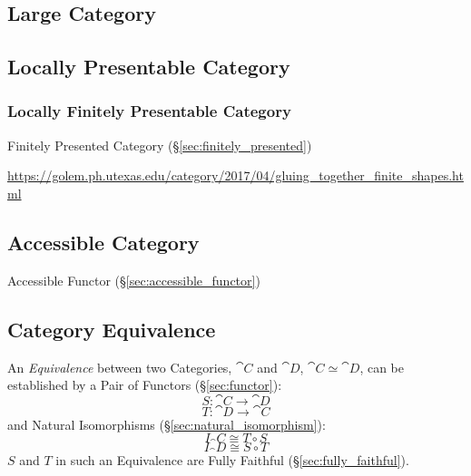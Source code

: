\subsection{Large Category}\label{sec:large_category}

\subsection{Locally Presentable Category}\label{sec:locally_presentable}



\subsubsection{Locally Finitely Presentable Category}
\label{sec:lfp_category}

\fist Finitely Presented Category (\S\ref{sec:finitely_presented})

\url{https://golem.ph.utexas.edu/category/2017/04/gluing_together_finite_shapes.html}



\subsection{Accessible Category}\label{sec:accessible_category}

Accessible Functor (\S\ref{sec:accessible_functor})



\subsection{Category Equivalence}\label{sec:category_equivalence}

An \emph{Equivalence} between two Categories, $\cat{C}$ and
$\cat{D}$, $\cat{C} \simeq \cat{D}$, can be established by a
Pair of Functors (\S\ref{sec:functor}):
\[
  S : \cat{C} \rightarrow \cat{D}
\]\[
  T : \cat{D} \rightarrow \cat{C}
\]
and Natural Isomorphisms (\S\ref{sec:natural_isomorphism}):
\[
  I_\cat{C} \cong T \circ S
\]\[
  I_\cat{D} \cong S \circ T
\]
$S$ and $T$ in such an Equivalence are Fully Faithful
(\S\ref{sec:fully_faithful}).

